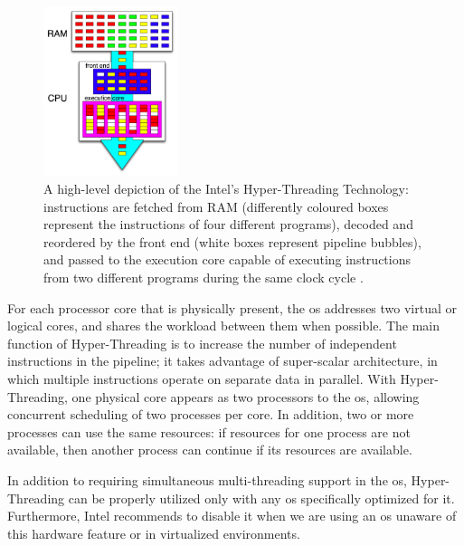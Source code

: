 \begin{figure}
	\centering{}
	\includegraphics[width=0.35\textwidth]{chapters/measurements/images/hyper-threading.png}
	\caption[Overview of Intel Hyper-Threading]{A high-level depiction of the Intel's Hyper-Threading
		Technology: instructions are fetched from RAM (differently coloured boxes represent the instructions
		of four different programs), decoded and reordered by the front end (white boxes represent pipeline bubbles),
		and passed to the execution core capable of executing instructions from two different programs during
		the same clock cycle \cite{hyperthreading}.}
	\label{img:measurements-cpu-hyperThreading}
\end{figure}

For each processor core that is physically present, the \acs{os} addresses two virtual or logical cores,
and shares the workload between them when possible. The main function of Hyper-Threading is to increase
the number of independent instructions in the pipeline; it takes advantage of super-scalar architecture,
in which multiple instructions operate on separate data in parallel. With Hyper-Threading, one physical
core appears as two processors to the \acs{os}, allowing concurrent scheduling of two processes
per core. In addition, two or more processes can use the same resources: if resources for one process
are not available, then another process can continue if its resources are available.

In addition to requiring simultaneous multi-threading support in the \acs{os}, Hyper-Threading can be
properly utilized only with any \acs{os} specifically optimized for it. Furthermore, Intel recommends
to disable it when we are using an \acs{os} unaware of this hardware feature or in virtualized
environments.

